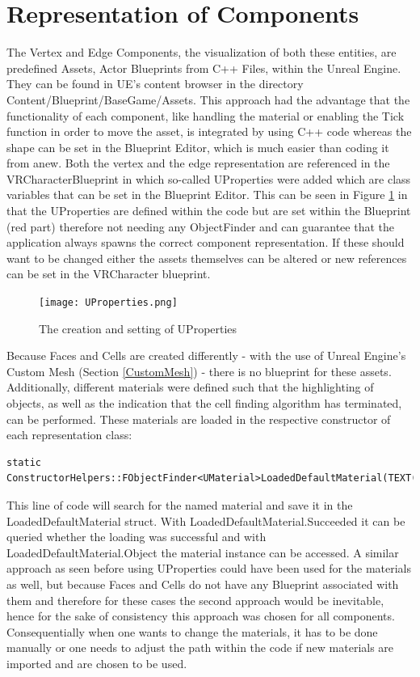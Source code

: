 \documentclass{report}
\begin{document}
	\section{Representation of Components} \label{ComponentRepresentation}
	\startsection
		The Vertex and Edge Components, the visualization of both these entities, are predefined Assets, Actor Blueprints from C++ Files, within the Unreal Engine. They can be found in UE's content browser in the directory Content/Blueprint/BaseGame/Assets. This approach had the advantage that the functionality of each component, like handling the material or enabling the Tick function in order to move the asset, is integrated by using C++ code whereas the shape can be set in the Blueprint Editor, which is much easier than coding it from anew. Both the vertex and the edge representation are referenced in the VRCharacterBlueprint in which so-called UProperties were added which are class variables that can be set in the Blueprint Editor. This can be seen in Figure \ref{UProperties} in that the UProperties are defined within the code but are set within the Blueprint (red part) therefore not needing any ObjectFinder and can guarantee that the application always spawns the correct component representation. If these should want to be changed either the assets themselves can be altered or new references can be set in the VRCharacter blueprint.
		\begin{figure}[H]
			\begin{center}
				\texttt{[image: UProperties.png]} 
				\caption{The creation and setting of UProperties}
				\label{UProperties}
			\end{center}
		\end{figure}
		\noindent Because Faces and Cells are created differently - with the use of Unreal Engine's Custom Mesh (Section \ref{CustomMesh}) - there is no blueprint for these assets. \\
		Additionally, different materials were defined such that the highlighting of objects, as well as the indication that the cell finding algorithm has terminated, can be performed. These materials are loaded in the respective constructor of each representation class:
		\begin{verbatim}
static ConstructorHelpers::FObjectFinder<UMaterial>LoadedDefaultMaterial(TEXT("path"));	
		\end{verbatim}
		This line of code will search for the named material and save it in the LoadedDefaultMaterial struct. With LoadedDefaultMaterial.Succeeded it can be queried whether the loading was successful and with LoadedDefaultMaterial.Object the material instance can be accessed. A similar approach as seen before using UProperties could have been used for the materials as well, but because Faces and Cells do not have any Blueprint associated with them and therefore for these cases the second approach would be inevitable, hence for the sake of consistency this approach was chosen for all components. Consequentially when one wants to change the materials, it has to be done manually or one needs to adjust the path within the code if new materials are imported and are chosen to be used.
	\closesection
	
\end{document}
